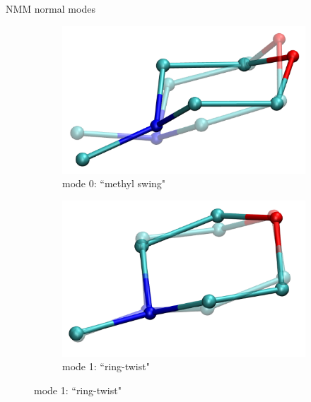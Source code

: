 \documentclass{beamer}
\begin{document}
%

\begin{frame}{NMM normal modes}
	\newcommand{\x}{0.18}
	\begin{figure}
		\centering
		\begin{subfigure}{\x\textwidth}
			\includegraphics[width=\textwidth]{mode0_ot.png}
			\caption{mode 0: ``methyl swing"}
		\end{subfigure}
		\begin{subfigure}{\x\textwidth}
			\includegraphics[width=\textwidth]{mode1_ot.png}
			\caption{mode 1: ``ring-twist"}
		\end{subfigure}

\end{figure}
\end{frame}
\end{document}
